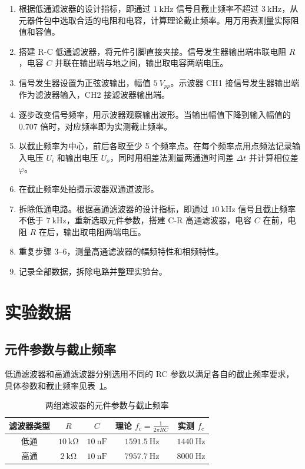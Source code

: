 \begin{enumerate}[label=\arabic*.]
    \item 根据低通滤波器的设计指标，即通过 \(\SI{1}{\kilo\hertz}\) 信号且截止频率不超过 \(\SI{3}{\kilo\hertz}\)，从元器件包中选取合适的电阻和电容，计算理论截止频率。用万用表测量实际阻值和容值。
    \item 搭建 R-C 低通滤波器，将元件引脚直接夹接。信号发生器输出端串联电阻 \(R\)，电容 \(C\) 并联在输出端与地之间，输出取电容两端电压。
    \item 信号发生器设置为正弦波输出，幅值 \(\SI{5}{V_{pp}}\)。示波器 CH1 接信号发生器输出端作为滤波器输入，CH2 接滤波器输出端。
    \item 逐步改变信号频率，用示波器观察输出波形。当输出幅值下降到输入幅值的 \(0.707\) 倍时，对应频率即为实测截止频率。
    \item 以截止频率为中心，前后各取至少 5 个频率点。在每个频率点用点频法记录输入电压 \(U_i\) 和输出电压 \(U_o\)，同时用相差法测量两通道时间差 \(\Delta t\) 并计算相位差 \(\varphi\)。
    \item 在截止频率处拍摄示波器双通道波形。
    \item 拆除低通电路。根据高通滤波器的设计指标，即通过 \(\SI{10}{\kilo\hertz}\) 信号且截止频率不低于 \(\SI{7}{\kilo\hertz}\)，重新选取元件参数，搭建 C-R 高通滤波器，电容 \(C\) 在前，电阻 \(R\) 在后，输出取电阻两端电压。
    \item 重复步骤 3--6，测量高通滤波器的幅频特性和相频特性。
    \item 记录全部数据，拆除电路并整理实验台。
\end{enumerate}

\section{实验数据}

\subsection{元件参数与截止频率}

低通滤波器和高通滤波器分别选用不同的 RC 参数以满足各自的截止频率要求，具体参数和截止频率见表~\ref{e6-tab:params}。

\begin{table}[H]
    \centering
    \caption{两组滤波器的元件参数与截止频率}
    \label{e6-tab:params}
    \begin{tabular}{ccccc}
        \toprule
        滤波器类型 & \(R\) & \(C\) & 理论 \(f_c=\frac{1}{2\pi RC}\) & 实测 \(f_c\) \\
        \midrule
        低通 & \(\SI{10}{\kilo\ohm}\) & \(\SI{10}{\nano\farad}\) & \(\SI{1591.5}{\hertz}\) & \(\SI{1440}{\hertz}\) \\
        高通 & \(\SI{2}{\kilo\ohm}\)  & \(\SI{10}{\nano\farad}\) & \(\SI{7957.7}{\hertz}\) & \(\SI{8000}{\hertz}\) \\
        \bottomrule
    \end{tabular}
\end{table}

